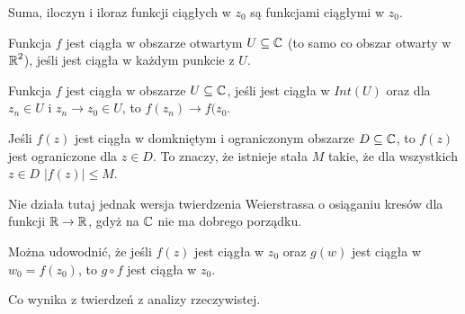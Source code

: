 Suma, iloczyn i iloraz funkcji ciągłych w $z_0$ są funkcjami ciągłymi w $z_0$. 

\begin{definition} 
  Funkcja $f$ jest ciągła w obszarze otwartym $U\subseteq \operatorname{\mathbb{C}}$ (to samo co obszar otwarty w $\operatorname{\mathbb{R}}^2$), jeśli jest ciągła w każdym punkcie z $U$.

  Funkcja $f$ jest ciągła w obszarze $U\subseteq \operatorname{\mathbb{C}}$, jeśli jest ciągła w $Int(U)$ oraz dla $z_n\in U$ i $z_n\to z_0\in U$, to $f(z_n)\to f(z_0$.
\end{definition}

\begin{theorem}[Weierstrassa]
  Jeśli $f(z)$ jest ciągła w domkniętym i ograniczonym obszarze $D\subseteq\operatorname{\mathbb{C}}$, to $f(z)$ jest ograniczone dla $z\in D$. To znaczy, że istnieje stała $M$ takie, że dla wszystkich $z\in D$ $|f(z)|\leq M$.
\end{theorem}

Nie działa tutaj jednak wersja twierdzenia Weierstrassa o osiąganiu kresów dla funkcji $\operatorname{\mathbb{R}}\to\operatorname{\mathbb{R}}$, gdyż na $\operatorname{\mathbb{C}}$ nie ma dobrego porządku.

\begin{lemma}
  Można udowodnić, że jeśli $f(z)$ jest ciągła w $z_0$ oraz $g(w)$ jest ciągła w $w_0=f(z_0)$, to $g\circ f$ jest ciągła w $z_0$.
\end{lemma}

Co wynika z twierdzeń z analizy rzeczywistej.

 
